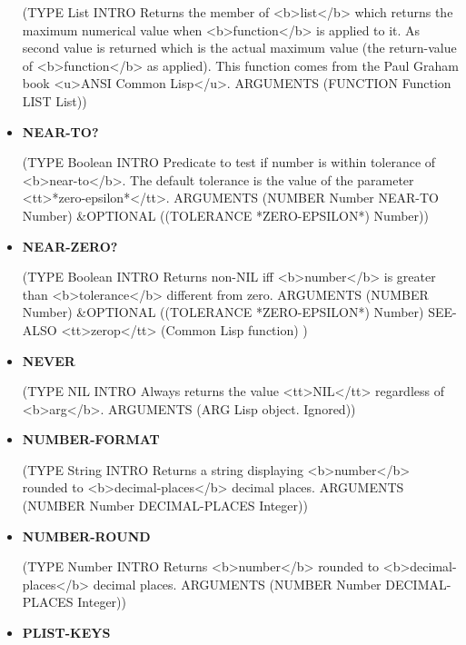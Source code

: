 \documentclass [11pt]{book}
\begin{document}
\begin{itemize}
(TYPE List INTRO  Returns the member of <b>list</b> which returns the maximum numerical value
when <b>function</b> is applied to it. As second value is returned which is the
actual maximum value (the return-value of <b>function</b> as applied). This function
comes from the Paul Graham book <u>ANSI Common Lisp</u>.
 ARGUMENTS (FUNCTION Function LIST List))



\item {}
\label{prim:near-to?}
\textbf{NEAR-TO?}

(TYPE Boolean INTRO  Predicate to test if number is within tolerance of
<b>near-to</b>. The default tolerance is the value of the parameter
<tt>*zero-epsilon*</tt>.
 ARGUMENTS (NUMBER Number NEAR-TO Number) \&OPTIONAL ((TOLERANCE *ZERO-EPSILON*) Number))



\item {}
\label{prim:near-zero?}
\textbf{NEAR-ZERO?}

(TYPE Boolean INTRO  Returns non-NIL iff <b>number</b> is greater than <b>tolerance</b> different
from zero.
 ARGUMENTS (NUMBER Number) \&OPTIONAL ((TOLERANCE *ZERO-EPSILON*) Number) SEE-ALSO <tt>zerop</tt> (Common Lisp function) 
)



\item {}
\label{prim:never}
\textbf{NEVER}

(TYPE NIL INTRO  Always returns the value <tt>NIL</tt> regardless of <b>arg</b>.
 ARGUMENTS (ARG Lisp object. Ignored))



\item {}
\label{prim:number-format}
\textbf{NUMBER-FORMAT}

(TYPE String INTRO  Returns a string displaying <b>number</b> rounded to <b>decimal-places</b> decimal places.
 ARGUMENTS (NUMBER Number DECIMAL-PLACES Integer))



\item {}
\label{prim:number-round}
\textbf{NUMBER-ROUND}

(TYPE Number INTRO  Returns <b>number</b> rounded to <b>decimal-places</b> decimal places.
 ARGUMENTS (NUMBER Number DECIMAL-PLACES Integer))



\item {}
\label{prim:plist-keys}
\textbf{PLIST-KEYS}


\end{itemize}
\end{document}
